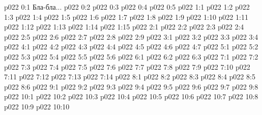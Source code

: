\author{Могущественный Посланник}
\vs p022 0:1  Бла-бла...
\vs p022 0:2 
\vs p022 0:3 
\vs p022 0:4 
\vs p022 0:5 
\vs p022 1:1 
\vs p022 1:2 
\vs p022 1:3 
\vs p022 1:4 
\vs p022 1:5 
\vs p022 1:6 
\vs p022 1:7 
\vs p022 1:8 
\vs p022 1:9 \pc 
\vs p022 1:10 \pc 
\vs p022 1:11 \pc 
\vs p022 1:12 \pc 
\vs p022 1:13 \pc 
\vs p022 1:14 
\vs p022 1:15 
\vs p022 2:1 
\vs p022 2:2 
\vs p022 2:3 
\vs p022 2:4 
\vs p022 2:5 
\vs p022 2:6 \pc 
\vs p022 2:7 \pc 
\vs p022 2:8 
\vs p022 2:9 
\vs p022 3:1 
\vs p022 3:2 
\vs p022 3:3 
\vs p022 3:4 
\vs p022 4:1 
\vs p022 4:2 
\vs p022 4:3 
\vs p022 4:4 \pc 
\vs p022 4:5 
\vs p022 4:6 
\vs p022 4:7 
\vs p022 5:1 
\vs p022 5:2 
\vs p022 5:3 
\vs p022 5:4 
\vs p022 5:5 
\vs p022 5:6 
\vs p022 6:1 
\vs p022 6:2 
\vs p022 6:3 
\vs p022 7:1 
\vs p022 7:2 
\vs p022 7:3 
\vs p022 7:4 
\vs p022 7:5 
\vs p022 7:6 
\vs p022 7:7 \pc 
\vs p022 7:8 
\vs p022 7:9 
\vs p022 7:10 \pc 
\vs p022 7:11 \pc 
\vs p022 7:12 
\vs p022 7:13 
\vs p022 7:14 
\vs p022 8:1 
\vs p022 8:2 \pc 
\vs p022 8:3 
\vs p022 8:4 
\vs p022 8:5 
\vs p022 8:6 
\vs p022 9:1 
\vs p022 9:2 
\vs p022 9:3 \pc 
\vs p022 9:4 
\vs p022 9:5 \pc 
\vs p022 9:6 
\vs p022 9:7 
\vs p022 9:8 
\vs p022 10:1 
\vs p022 10:2 \pc 
\vs p022 10:3 
\vs p022 10:4 \pc 
\vs p022 10:5 \pc 
\vs p022 10:6 
\vs p022 10:7 \pc 
\vs p022 10:8 
\vs p022 10:9 \pc 
\vsetoff
\vs p022 10:10 
\quizlink
